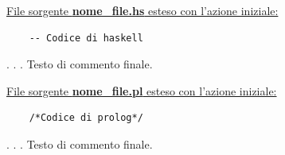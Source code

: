 \documentclass{article}
\begin{document}
\underline{File sorgente \textbf{nome\_file.hs} esteso con l'azione iniziale:}
\lstset{language=Haskell}
\begin{lstlisting}
	-- Codice di haskell
\end{lstlisting}
.
\newline
.
\newline
.
\newline
Testo di commento finale.
\newpage
\raggedright
\underline{File sorgente \textbf{nome\_file.pl} esteso con l'azione iniziale:}
\lstset{language=Prolog}
\begin{lstlisting}
	/*Codice di prolog*/
\end{lstlisting}
.
\newline
.
\newline
.
\newline
Testo di commento finale.
\end{document}
